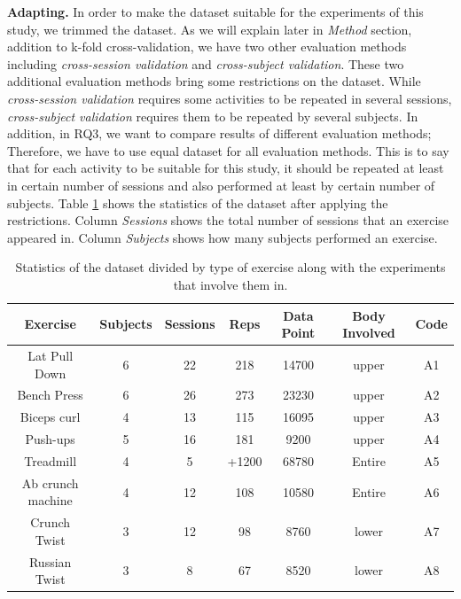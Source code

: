 \documentclass[journal,article,submit,moreauthors,pdftex]{Definitions/mdpi}
\begin{document}
\noindent\textbf{Adapting.} In order to make the dataset suitable for the experiments of this study, we trimmed the dataset. As we will explain later in \textit{Method} section, addition to k-fold cross-validation, we have two other evaluation methods including \textit{cross-session validation} and \textit{cross-subject validation}. These two additional evaluation methods bring some restrictions on the dataset. While \textit{cross-session validation} requires some activities to be repeated in several sessions, \textit{cross-subject validation} requires them to be repeated by several subjects. In addition, in RQ3, we want to compare results of different evaluation methods; Therefore, we have to use equal dataset for all evaluation methods. This is to say that for each activity to be suitable for this study, it should be repeated at least in certain number of sessions and also performed at least by certain number of subjects.
Table \ref{dataset_statistics} shows the statistics of the dataset after applying the restrictions. Column \textit{Sessions} shows the total number of sessions that an exercise appeared in. Column \textit{Subjects} shows how many subjects performed an exercise.
\begin{table}[H]
	\caption{Statistics of the dataset divided by type of exercise along with the experiments that involve them in.}
	\centering
	\begin{tabular}{ccccc|cc}
		\toprule
		\textbf{Exercise} & \textbf{Subjects} & \textbf{Sessions}	 & \textbf{Reps} & \textbf{Data Point}& \textbf{Body Involved}	& \textbf{Code}  \\
		\midrule		
		Lat Pull Down& 6& 22& 218& 14700& upper 		& A1\\
		Bench Press	& 6& 26& 273& 23230& upper 			& A2\\
		Biceps curl	& 4& 13& 115& 16095& upper			& A3\\
		Push-ups & 5& 16& 181& 9200& upper			& A4\\
		Treadmill& 4& 5& +1200 & 68780& Entire 			& A5\\
		Ab crunch machine& 4& 12& 108 & 10580& Entire & A6\\
		Crunch Twist &  3& 12& 98& 8760& lower			& A7 \\
		Russian Twist & 3& 8& 67& 8520& lower			& A8\\
		\bottomrule
	\end{tabular}
	\label{dataset_statistics}
\end{table}
\end{document}
